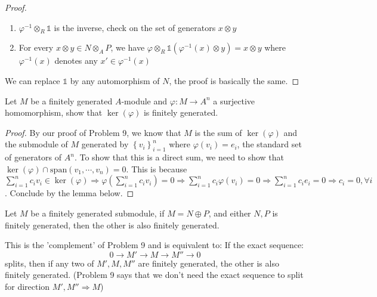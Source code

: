 \documentclass{solution}
\begin{document}
\begin{proof}
    \begin{enumerate}
        \item $\varphi ^{-1} \otimes_R \mathds{1}$ is the inverse, check on the set of generators $x \otimes y$
        \item For every $x \otimes y \in N \otimes_A P$, we have $\varphi \otimes_R \mathds{1}(\varphi ^{-1}(x) \otimes y) = x \otimes y$ where $\varphi ^{-1}(x)$ denotes any $x' \in \varphi ^{-1} (x)$
    \end{enumerate}

    We can replace $\mathds{1}$ by any automorphism of $N$, the proof is basically the same.
\end{proof}

\begin{problem}
    Let $M$ be a finitely generated $A$-module and $\varphi: M \rightarrow A^n$ a surjective homomorphism, show that $\ker (\varphi)$ is finitely generated.
\end{problem}

\begin{proof}
    By our proof of Problem 9, we know that $M$ is the sum of $\ker(\varphi)$ and the submodule of $M$ generated by $\left\lbrace v_i \right\rbrace_{i = 1}^n$ where $\varphi(v_i) = e_i$, the standard set of generators of $A^n$. To show that this is a direct sum, we need to show that $\ker(\varphi) \cap \mathrm{span}(v_1, \cdots, v_n) = 0$. This is because $\sum\limits_{i = 1}^{n} c_i v_i \in \ker (\varphi) \Rightarrow \varphi \left(\sum\limits_{i = 1}^{n} c_iv_i\right) = 0 \Rightarrow \sum\limits_{i = 1}^{n} c_i \varphi(v_i) = 0 \Rightarrow \sum\limits_{i = 1}^{n} c_i e_i = 0 \Rightarrow c_i = 0, \forall i$. Conclude by the lemma below.
\end{proof}

\begin{lemma}
    Let $M$ be a finitely generated submodule, if $M = N \oplus P$, and either $N, P$ is finitely generated, then the other is also finitely generated.

    This is the 'complement' of Problem 9 and is equivalent to: If the exact sequence:
    $$0 \rightarrow M' \rightarrow M \rightarrow M'' \rightarrow 0$$
    splits, then if any two of $M', M, M''$ are finitely generated, the other is also finitely generated. (Problem 9 says that we don't need the exact sequence to split for direction $M', M'' \Rightarrow M$)
\end{lemma}
\end{document}
